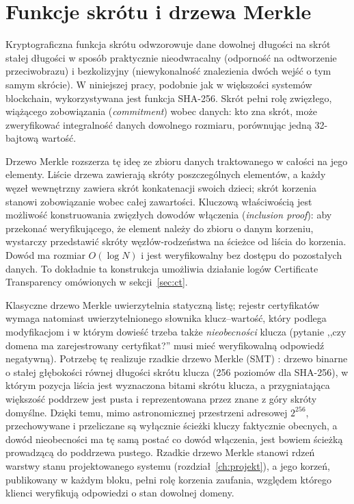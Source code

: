 \section{Funkcje skrótu i drzewa Merkle}
\label{sec:merkle}

Kryptograficzna funkcja skrótu odwzorowuje dane dowolnej długości na skrót stałej długości w sposób praktycznie nieodwracalny (odporność na odtworzenie przeciwobrazu) i bezkolizyjny (niewykonalność znalezienia dwóch wejść o tym samym skrócie). W niniejszej pracy, podobnie jak w większości systemów blockchain, wykorzystywana jest funkcja SHA-256. Skrót pełni rolę zwięzłego, wiążącego zobowiązania (\emph{commitment}) wobec danych: kto zna skrót, może zweryfikować integralność danych dowolnego rozmiaru, porównując jedną 32-bajtową wartość.

Drzewo Merkle \cite{merkle1987digital} rozszerza tę ideę ze zbioru danych traktowanego w całości na jego elementy. Liście drzewa zawierają skróty poszczególnych elementów, a każdy węzeł wewnętrzny zawiera skrót konkatenacji swoich dzieci; skrót korzenia stanowi zobowiązanie wobec całej zawartości. Kluczową właściwością jest możliwość konstruowania zwięzłych dowodów włączenia (\emph{inclusion proof}): aby przekonać weryfikującego, że element należy do zbioru o danym korzeniu, wystarczy przedstawić skróty węzłów-rodzeństwa na ścieżce od liścia do korzenia. Dowód ma rozmiar $O(\log N)$ i jest weryfikowalny bez dostępu do pozostałych danych. To dokładnie ta konstrukcja umożliwia działanie logów Certificate Transparency omówionych w sekcji~\ref{sec:ct}.

Klasyczne drzewo Merkle uwierzytelnia statyczną listę; rejestr certyfikatów wymaga natomiast uwierzytelnionego słownika klucz--wartość, który podlega modyfikacjom i w którym dowieść trzeba także \emph{nieobecności} klucza (pytanie ,,czy domena ma zarejestrowany certyfikat?'' musi mieć weryfikowalną odpowiedź negatywną). Potrzebę tę realizuje rzadkie drzewo Merkle (SMT) \cite{dahlberg2016smt}: drzewo binarne o stałej głębokości równej długości skrótu klucza (256 poziomów dla SHA-256), w którym pozycja liścia jest wyznaczona bitami skrótu klucza, a przygniatająca większość poddrzew jest pusta i reprezentowana przez znane z góry skróty domyślne. Dzięki temu, mimo astronomicznej przestrzeni adresowej $2^{256}$, przechowywane i przeliczane są wyłącznie ścieżki kluczy faktycznie obecnych, a dowód nieobecności ma tę samą postać co dowód włączenia, jest bowiem ścieżką prowadzącą do poddrzewa pustego. Rzadkie drzewo Merkle stanowi rdzeń warstwy stanu projektowanego systemu (rozdział~\ref{ch:projekt}), a jego korzeń, publikowany w każdym bloku, pełni rolę korzenia zaufania, względem którego klienci weryfikują odpowiedzi o stan dowolnej domeny.

